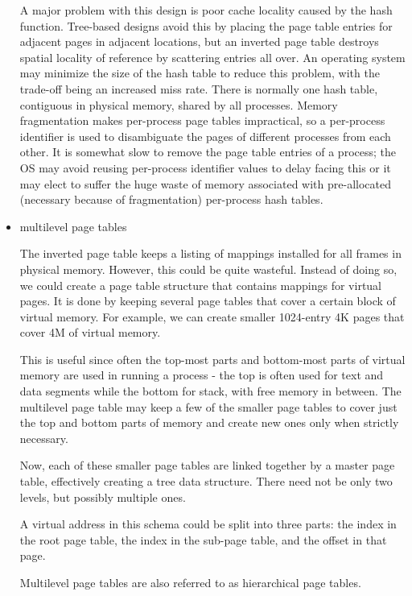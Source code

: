 \documentclass{article}
\begin{document}
\begin{itemize}
A major problem with this design is poor cache locality caused by the hash function. Tree-based designs avoid this by placing the page table entries for adjacent pages in adjacent locations, but an inverted page table destroys spatial locality of reference by scattering entries all over. An operating system may minimize the size of the hash table to reduce this problem, with the trade-off being an increased miss rate. There is normally one hash table, contiguous in physical memory, shared by all processes. Memory fragmentation makes per-process page tables impractical, so a per-process identifier is used to disambiguate the pages of different processes from each other. It is somewhat slow to remove the page table entries of a process; the OS may avoid reusing per-process identifier values to delay facing this or it may elect to suffer the huge waste of memory associated with pre-allocated (necessary because of fragmentation) per-process hash tables.

\item multilevel page tables

The inverted page table keeps a listing of mappings installed for all frames in physical memory. However, this could be quite wasteful. Instead of doing so, we could create a page table structure that contains mappings for virtual pages. It is done by keeping several page tables that cover a certain block of virtual memory. For example, we can create smaller 1024-entry 4K pages that cover 4M of virtual memory.

This is useful since often the top-most parts and bottom-most parts of virtual memory are used in running a process - the top is often used for text and data segments while the bottom for stack, with free memory in between. The multilevel page table may keep a few of the smaller page tables to cover just the top and bottom parts of memory and create new ones only when strictly necessary.

Now, each of these smaller page tables are linked together by a master page table, effectively creating a tree data structure. There need not be only two levels, but possibly multiple ones.

A virtual address in this schema could be split into three parts: the index in the root page table, the index in the sub-page table, and the offset in that page.

Multilevel page tables are also referred to as hierarchical page tables.
\end{itemize}
\end{document}
